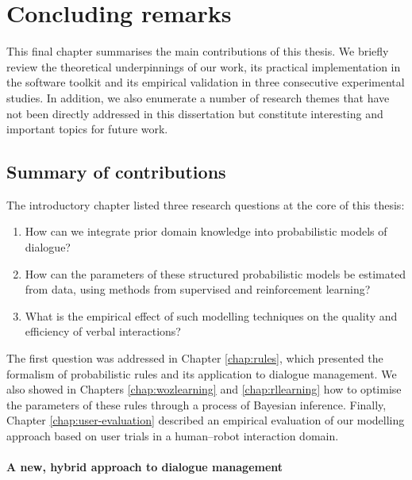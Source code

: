 \chapter{Concluding remarks}
\label{chap:conclusions}

This final chapter summarises the main contributions of this thesis.  We briefly review the theoretical underpinnings of our work, its practical implementation in the \opendial{} software toolkit and its empirical validation in three consecutive experimental studies.  In addition, we also enumerate a number of research themes that have not been directly addressed in this dissertation but constitute interesting and important topics for future work. 

\section{Summary of contributions}

The introductory chapter listed three research questions at the core of this thesis:
\begin{enumerate}
\item How can we integrate prior domain knowledge into probabilistic models of dialogue?
\item How can the parameters of these structured probabilistic models be estimated from data, using methods from supervised and reinforcement learning?  
\item What is the empirical effect of such modelling techniques on the quality and efficiency of verbal interactions?
\end{enumerate}

The first question was addressed in Chapter \ref{chap:rules}, which presented the formalism of probabilistic rules and its application to dialogue management.  We also showed in Chapters \ref{chap:wozlearning} and \ref{chap:rllearning} how to optimise the parameters of these rules through a process of Bayesian inference.  Finally, Chapter \ref{chap:user-evaluation} described an empirical evaluation of our modelling approach based on user trials in a human--robot interaction domain.


\subsubsection*{A new, hybrid approach to dialogue management}


